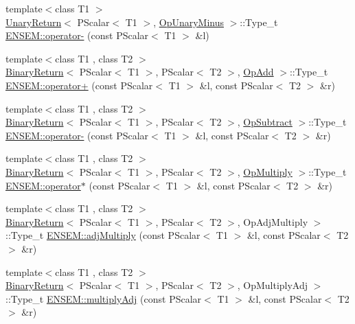 \begin{DoxyCompactItemize}
\item 
{\footnotesize template$<$class T1 $>$ }\\\mbox{\hyperlink{structUnaryReturn}{Unary\+Return}}$<$ P\+Scalar$<$ T1 $>$, \mbox{\hyperlink{structOpUnaryMinus}{Op\+Unary\+Minus}} $>$\+::Type\+\_\+t \mbox{\hyperlink{group__primscalar_ga827ddd79e3c1d2cd23eb9712523df1c9}{E\+N\+S\+E\+M\+::operator-\/}} (const P\+Scalar$<$ T1 $>$ \&l)
\item 
{\footnotesize template$<$class T1 , class T2 $>$ }\\\mbox{\hyperlink{structBinaryReturn}{Binary\+Return}}$<$ P\+Scalar$<$ T1 $>$, P\+Scalar$<$ T2 $>$, \mbox{\hyperlink{structOpAdd}{Op\+Add}} $>$\+::Type\+\_\+t \mbox{\hyperlink{group__primscalar_ga6cdeef7aca88574749d835692921d6e6}{E\+N\+S\+E\+M\+::operator+}} (const P\+Scalar$<$ T1 $>$ \&l, const P\+Scalar$<$ T2 $>$ \&r)
\item 
{\footnotesize template$<$class T1 , class T2 $>$ }\\\mbox{\hyperlink{structBinaryReturn}{Binary\+Return}}$<$ P\+Scalar$<$ T1 $>$, P\+Scalar$<$ T2 $>$, \mbox{\hyperlink{structOpSubtract}{Op\+Subtract}} $>$\+::Type\+\_\+t \mbox{\hyperlink{group__primscalar_gad6a80202334f9602e241a71a58828d69}{E\+N\+S\+E\+M\+::operator-\/}} (const P\+Scalar$<$ T1 $>$ \&l, const P\+Scalar$<$ T2 $>$ \&r)
\item 
{\footnotesize template$<$class T1 , class T2 $>$ }\\\mbox{\hyperlink{structBinaryReturn}{Binary\+Return}}$<$ P\+Scalar$<$ T1 $>$, P\+Scalar$<$ T2 $>$, \mbox{\hyperlink{structOpMultiply}{Op\+Multiply}} $>$\+::Type\+\_\+t \mbox{\hyperlink{group__primscalar_ga73b8e82a534a7eb469fb90a9e25271df}{E\+N\+S\+E\+M\+::operator$\ast$}} (const P\+Scalar$<$ T1 $>$ \&l, const P\+Scalar$<$ T2 $>$ \&r)
\item 
{\footnotesize template$<$class T1 , class T2 $>$ }\\\mbox{\hyperlink{structBinaryReturn}{Binary\+Return}}$<$ P\+Scalar$<$ T1 $>$, P\+Scalar$<$ T2 $>$, Op\+Adj\+Multiply $>$\+::Type\+\_\+t \mbox{\hyperlink{group__primscalar_gacd01dab554ff851aa1ca0012ec9accf0}{E\+N\+S\+E\+M\+::adj\+Multiply}} (const P\+Scalar$<$ T1 $>$ \&l, const P\+Scalar$<$ T2 $>$ \&r)
\item 
{\footnotesize template$<$class T1 , class T2 $>$ }\\\mbox{\hyperlink{structBinaryReturn}{Binary\+Return}}$<$ P\+Scalar$<$ T1 $>$, P\+Scalar$<$ T2 $>$, Op\+Multiply\+Adj $>$\+::Type\+\_\+t \mbox{\hyperlink{group__primscalar_gabacc9ee173ff2dff79b3faed5f551bfd}{E\+N\+S\+E\+M\+::multiply\+Adj}} (const P\+Scalar$<$ T1 $>$ \&l, const P\+Scalar$<$ T2 $>$ \&r)

\end{DoxyCompactItemize}
